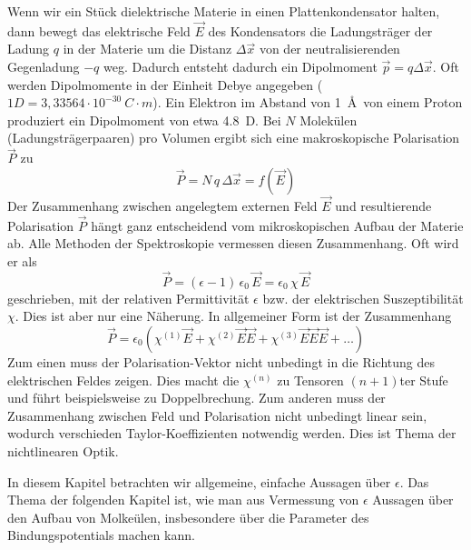 Wenn wir ein Stück dielektrische Materie in einen Plattenkondensator halten, dann bewegt das elektrische Feld $\vec{E}$ des Kondensators die Ladungsträger der Ladung $q$ in der Materie um  die Distanz $\Delta  \vec{x}$ von der neutralisierenden Gegenladung $-q$ weg. Dadurch entsteht dadurch ein Dipolmoment $\vec{p} = q \Delta \vec{x}$. Oft werden Dipolmomente in der Einheit Debye angegeben ($1 D = 3{,}33564 \cdot 10^{-30} \ C \cdot m$). Ein Elektron im Abstand von 1~\AA\ von einem Proton produziert ein Dipolmoment von etwa 4.8~D. Bei $N$ Molekülen (Ladungsträgerpaaren) pro Volumen ergibt sich eine makroskopische Polarisation $\vec{P}$ zu
\begin{equation}
\vec{P} = N \, q \, \Delta \vec{x} = f(\vec{E})
\end{equation}
Der Zusammenhang zwischen angelegtem externen Feld $\vec{E}$ und resultierende 
Polarisation $\vec{P}$ hängt ganz entscheidend vom mikroskopischen Aufbau der Materie ab. Alle Methoden der Spektroskopie vermessen diesen Zusammenhang. Oft wird er als 
\begin{equation}
 \vec{P} =  (\epsilon - 1) \, \epsilon_0 \, \vec{E} = \epsilon_0 \,\chi \, \vec{E} 
 \label{eq:diel_p_lin}
\end{equation}
geschrieben, mit der relativen Permittivität $\epsilon$ bzw. der elektrischen Suszeptibilität $\chi$. Dies ist aber nur eine Näherung. In allgemeiner Form ist der Zusammenhang
\begin{equation}
\vec{P}  = \epsilon_0 \left( \chi^{(1)} \vec{E} + \chi^{(2)} \vec{E}  \vec{E} +  \chi^{(3)} \vec{E}  \vec{E}  \vec{E}  + \dots \right)
\end{equation}
Zum einen muss der Polarisation-Vektor nicht unbedingt in die Richtung des elektrischen Feldes zeigen. Dies macht die $\chi^{(n)}$ zu Tensoren $(n+1)$ter Stufe und führt beispielsweise zu Doppelbrechung. Zum anderen muss der Zusammenhang zwischen Feld und Polarisation nicht unbedingt linear sein, wodurch verschieden Taylor-Koeffizienten notwendig werden. Dies ist Thema der nichtlinearen Optik.

In diesem Kapitel betrachten wir allgemeine, einfache Aussagen über $\epsilon$.
Das Thema der folgenden Kapitel ist, wie man aus Vermessung von $\epsilon$ Aussagen über den Aufbau  von Molkeülen, insbesondere über die Parameter des Bindungspotentials machen kann.


